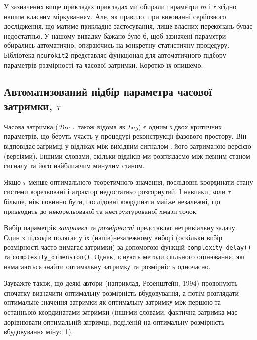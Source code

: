 \documentclass[
  letterpaper,
]{report}
\begin{document}
У зазначених вище прикладах прикладах ми обирали параметри \(m\) і
\(\tau\) згідно нашим власним міркуванням. Але, як правило, при
виконанні серйозного дослідження, що матиме прикладне застосування, лише
власних переконань буває недостатньо. У нашому випадку бажано було б,
щоб зазначені параметри обирались автоматично, опираючись на конкретну
статистичну процедуру. Бібліотека \texttt{neurokit2} представляє
функціонал для автоматичного підбору параметрів розмірності та часової
затримки. Коротко їх опишемо.

\hypertarget{ux430ux432ux442ux43eux43cux430ux442ux438ux437ux43eux432ux430ux43dux438ux439-ux43fux456ux434ux431ux456ux440-ux43fux430ux440ux430ux43cux435ux442ux440ux430-ux447ux430ux441ux43eux432ux43eux457-ux437ux430ux442ux440ux438ux43cux43aux438-tau}{%
\subsection{\texorpdfstring{Автоматизований підбір параметра часової
затримки,
\(\tau\)}{Автоматизований підбір параметра часової затримки, \textbackslash tau}}\label{ux430ux432ux442ux43eux43cux430ux442ux438ux437ux43eux432ux430ux43dux438ux439-ux43fux456ux434ux431ux456ux440-ux43fux430ux440ux430ux43cux435ux442ux440ux430-ux447ux430ux441ux43eux432ux43eux457-ux437ux430ux442ux440ux438ux43cux43aux438-tau}}

Часова затримка (\emph{Tau} \(\tau\) також відома як \emph{Lag}) є одним
з двох критичних параметрів, що беруть участь у процедурі реконструкції
фазового простору. Він відповідає затримці у відліках між вихідним
сигналом і його затриманою версією (версіями). Іншими словами, скільки
відліків ми розглядаємо між певним станом сигналу та його найближчим
минулим станом.

Якщо \(\tau\) менше оптимального теоретичного значення, послідовні
координати стану системи корельовані і атрактор недостатньо розгорнутий.
І навпаки, коли \(\tau\) більше, ніж повинно бути, послідовні координати
майже незалежні, що призводить до некорельованої та неструктурованої
хмари точок.

Вибір параметрів \emph{затримки} та \emph{розмірності} представляє
нетривіальну задачу. Один з підходів полягає у їх (напів)незалежному
виборі (оскільки вибір розмірності часто вимагає затримки) за допомогою
функцій \texttt{complexity\_delay()} та
\texttt{complexity\_dimension()}. Однак, існують методи спільного
оцінювання, які намагаються знайти оптимальну затримку та розмірність
одночасно.

Зауважте також, що деякі автори (наприклад, Розенштейн, 1994) пропонують
спочатку визначити оптимальну розмірність вбудовування, а потім
розглядати оптимальне значення затримки як оптимальну затримку між
першою та останньою координатами затримки (іншими словами, фактична
затримка має дорівнювати оптимальній затримці, поділеній на оптимальну
розмірність вбудовування мінус 1).
\end{document}
